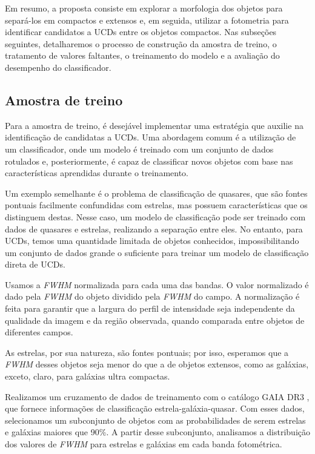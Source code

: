 Em resumo, a proposta consiste em explorar a morfologia dos objetos para separá-los em compactos e extensos e, em seguida, utilizar a fotometria para identificar candidatos a UCDs entre os objetos compactos. Nas subseções seguintes, detalharemos o processo de construção da amostra de treino, o tratamento de valores faltantes, o treinamento do modelo e a avaliação do desempenho do classificador.



\subsection{Amostra de treino}\label{subsec:amostra_treino}
Para a amostra de treino, é desejável implementar uma estratégia que auxilie na identificação de candidatas a UCDs. Uma abordagem comum é a utilização de um classificador, onde um modelo é treinado com um conjunto de dados rotulados e, posteriormente, é capaz de classificar novos objetos com base nas características aprendidas durante o treinamento.

Um exemplo semelhante é o problema de classificação de quasares, que são fontes pontuais facilmente confundidas com estrelas, mas possuem características que os distinguem destas. Nesse caso, um modelo de classificação pode ser treinado com dados de quasares e estrelas, realizando a separação entre eles. No entanto, para UCDs, temos uma quantidade limitada de objetos conhecidos, impossibilitando um conjunto de dados grande o suficiente para treinar um modelo de classificação direta de UCDs.

Usamos a \textit{FWHM} normalizada para cada uma das bandas. O valor normalizado é dado pela \textit{FWHM} do objeto dividido pela \textit{FWHM} do campo. A normalização é feita para garantir que a largura do perfil de intensidade seja independente da qualidade da imagem e da região observada, quando comparada entre objetos de diferentes campos.

As estrelas, por sua natureza, são fontes pontuais; por isso, esperamos que a \textit{FWHM} desses objetos seja menor do que a de objetos extensos, como as galáxias, exceto, claro, para galáxias ultra compactas.

Realizamos um cruzamento de dados de treinamento com o catálogo GAIA DR3 \citep{GAIA_DR3}, que fornece informações de classificação estrela-galáxia-quasar. Com esses dados, selecionamos um subconjunto de objetos com as probabilidades de serem estrelas e galáxias maiores que 90\%. A partir desse subconjunto, analisamos a distribuição dos valores de \textit{FWHM} para estrelas e galáxias em cada banda fotométrica.

